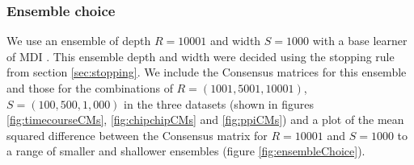 \documentclass[]{article}
\begin{document}
\subsubsection{Ensemble choice}
We use an ensemble of depth $R=10001$ and width $S=1000$ with a base learner of MDI \citep[using the software implementation from][]{mason2016mdi}. This ensemble depth and width were decided using the stopping rule from section \ref{sec:stopping}. We include the Consensus matrices for this ensemble and those for the combinations of $R = (1001, 5001, 10001)$, $S=(100, 500, 1,000)$ in the three datasets (shown in figures \ref{fig:timecourseCMs}, \ref{fig:chipchipCMs} and \ref{fig:ppiCMs}) and a plot of the mean squared difference between the Consensus matrix for $R=10001$ and $S=1000$ to a range of smaller and shallower ensembles (figure \ref{fig:ensembleChoice}).
\end{document}

